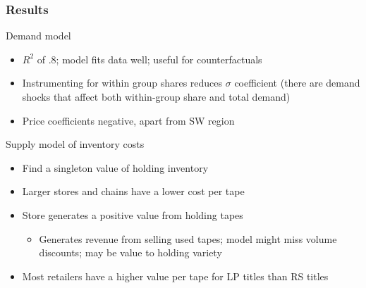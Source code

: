 \documentclass[notes=show]{beamer}
\begin{document}

\begin{frame}
\frametitle{Results}

Demand model

\begin{itemize}
\item $R^2$ of .8; model fits data well; useful for counterfactuals

\item Instrumenting for within group shares reduces $\sigma$ coefficient
(there are demand shocks that affect both within-group share and total
demand)

\item Price coefficients negative, apart from SW region
\end{itemize}

Supply model of inventory costs

\begin{itemize}
\item Find a singleton value of holding inventory

\item Larger stores and chains have a lower cost per tape

\item Store generates a positive value from holding tapes

\begin{itemize}
\item Generates revenue from selling used tapes; model might miss volume
discounts; may be value to holding variety
\end{itemize}

\item Most retailers have a higher value per tape for LP titles than RS
titles
\end{itemize}
\end{frame}

\end{document}
